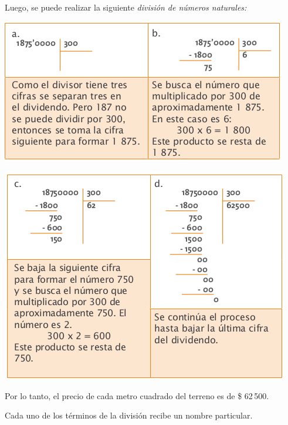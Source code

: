 \documentclass[letterpaper,11pt,twoside]{article}
\begin{document}
\begin{multicols}{2}
Luego, se puede realizar la siguiente \emph{división de números naturales:}
\begin{center}
\includegraphics[scale=.5]{Images/division.png} 
\end{center}
\begin{center}
\includegraphics[scale=.5]{Images/divison02.png} 
\end{center}
Por lo tanto, el precio de cada metro cuadrado del terreno es de \$ 62\,500.

Cada uno de los términos de la división recibe un nombre particular.


\end{multicols}
\end{document}
